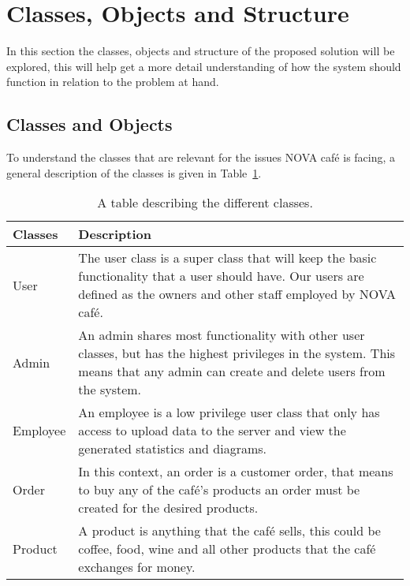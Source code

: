 \section{Classes, Objects and Structure}\label{sec:classes-objects-and-structure}

In this section the classes, objects and structure of the proposed solution will be explored, this
will help get a more detail understanding of how the system should function in relation to the problem at hand.


\subsection{Classes and Objects}\label{subsec:classes-and-objects}
To understand the classes that are relevant for the issues NOVA café is facing,
a general description of the classes is given in Table~\ref{tab:class-table}.

\begin{table}[H]
    \centering
    \begin{tabular} { m{2.5cm} m{10cm} }
        \toprule
        \textbf{Classes} & \textbf{Description} \\
        \midrule
        User & The user class is a super class that will keep the
        basic functionality that a user should have.
        Our users are defined as the owners and other staff employed by NOVA café. \\
        \midrule
        Admin & An admin shares most functionality with other user classes,
        but has the highest privileges in the system.
        This means that any admin can create and delete users from the system. \\
        \midrule
        Employee & An employee is a low privilege user class
        that only has access to upload data to the server and
        view the generated statistics and diagrams. \\
        \midrule
        Order & In this context, an order is a customer order,
        that means to buy any of the café's products an order must be created
        for the desired products. \\
        \midrule
        Product & A product is anything that the café sells,
        this could be coffee, food, wine and all other products that
        the café exchanges for money. \\
        \bottomrule
    \end{tabular}
    \caption{A table describing the different classes.}\label{tab:class-table}
\end{table}

